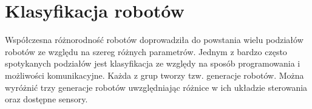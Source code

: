 \section{Klasyfikacja robotów}
Współczesna różnorodność robotów doprowadziła do powstania wielu podziałów
robotów ze względu na szereg różnych parametrów. Jednym z bardzo często
spotykanych podziałów jest klasyfikacja ze względy na sposób programowania i
możliwości komunikacyjne. Każda z grup tworzy tzw. generacje robotów. Można
wyróżnić trzy generacje robotów uwzględniając różnice w ich układzie sterowania
oraz dostępne sensory\cite{website:robotyka-pl}.
